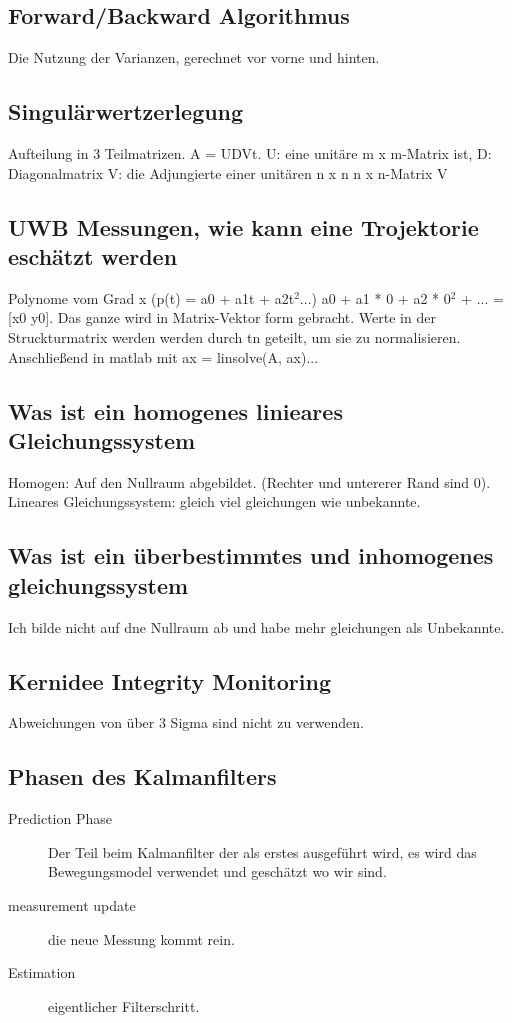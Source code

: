 \subsection{Forward/Backward Algorithmus}
Die Nutzung der Varianzen, gerechnet vor vorne und hinten.
\subsection{Singulärwertzerlegung}
 Aufteilung in 3 Teilmatrizen. A = UDVt. U: eine unitäre  m x m-Matrix ist, D: Diagonalmatrix V:  die Adjungierte einer unitären n x n  n x n-Matrix V
\subsection{UWB Messungen, wie kann eine Trojektorie eschätzt werden}
Polynome vom Grad x (p(t) = a0 + a1t + a2t$^2$...) a0 + a1 * 0 + a2 * 0$^2$ + ... = [x0 y0]. Das ganze wird in Matrix-Vektor form gebracht.  Werte in der Struckturmatrix werden werden durch tn geteilt, um sie zu normalisieren. Anschließend in matlab mit ax = linsolve(A, ax)... 
\subsection{Was ist ein homogenes linieares Gleichungssystem}
Homogen: Auf den Nullraum abgebildet. (Rechter und untererer Rand sind 0). Lineares Gleichungssystem: gleich viel gleichungen wie unbekannte.
\subsection{Was ist ein überbestimmtes und inhomogenes gleichungssystem}
Ich bilde nicht auf dne Nullraum ab und habe mehr gleichungen als Unbekannte.

\subsection{Kernidee Integrity Monitoring}

Abweichungen von über 3 Sigma sind nicht zu verwenden.

\subsection{Phasen des Kalmanfilters}
\begin{description}
\item[Prediction Phase] Der Teil beim Kalmanfilter der als erstes ausgeführt wird, es wird das Bewegungsmodel verwendet und geschätzt wo wir sind.
\item[measurement update] die neue Messung kommt rein.
\item[Estimation] eigentlicher Filterschritt.
\end{description}

